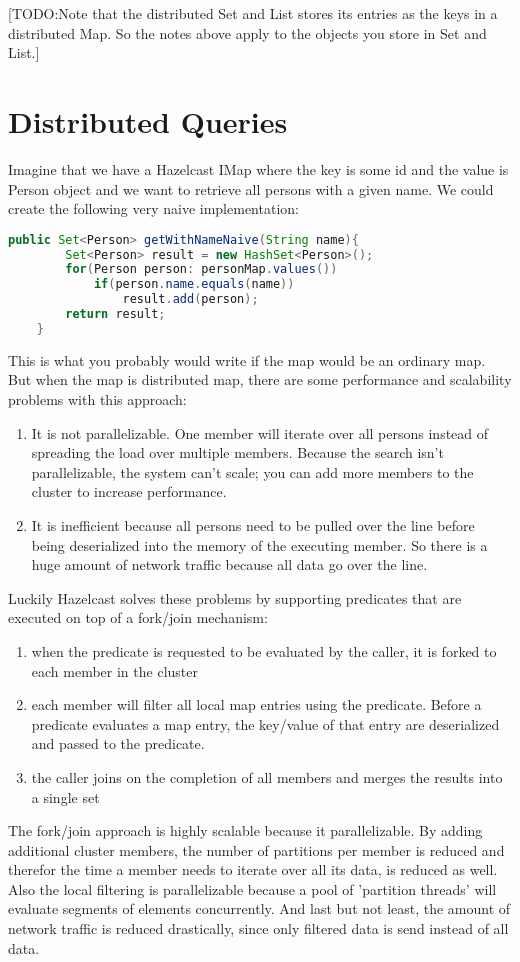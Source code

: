 [TODO:Note that the distributed Set and List stores its entries as the keys in a distributed Map. So the notes above apply to the objects you store in Set and List.]

\section{Distributed Queries}
Imagine that we have a Hazelcast IMap where the key is some id and the value is Person object and we want to retrieve all persons with a given name. We could create the following very naive implementation:
\begin{lstlisting}[language=java]
   public Set<Person> getWithNameNaive(String name){
        Set<Person> result = new HashSet<Person>();
        for(Person person: personMap.values())
            if(person.name.equals(name))
                result.add(person);
        return result;
    }
\end{lstlisting}
This is what you probably would write if the map would be an ordinary map. But when the map is distributed map, there are some performance and scalability problems with this approach:
\begin{enumerate}
\item It is not parallelizable. One member will iterate over all persons instead of spreading the load over multiple members. Because the search isn't parallelizable, the system can't scale; you can add more members to the cluster to increase performance.
\item It is inefficient because all persons need to be pulled over the line before being deserialized into the memory of the executing member. So there is a huge amount of network traffic because all data go over the line.
\end{enumerate}

Luckily Hazelcast solves these problems by supporting predicates that are executed on top of a fork/join mechanism:
\begin{enumerate}
\item when the predicate is requested to be evaluated by the caller, it is forked to each member in the cluster
\item each member will filter all local map entries using the predicate. Before a predicate evaluates a map entry, the key/value of that entry are deserialized and passed to the predicate. 
\item the caller joins on the completion of all members and merges the results into a single set
\end{enumerate}
The fork/join approach is highly scalable because it parallelizable. By adding additional cluster members, the number of partitions per member is reduced and therefor the time a member needs to iterate over all its data, is reduced as well. Also the local filtering is parallelizable because a pool of 'partition threads' will evaluate segments of elements concurrently. And last but not least, the amount of network traffic is reduced drastically, since only filtered data is send instead of all data.

